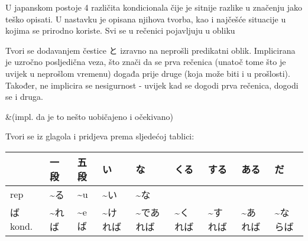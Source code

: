 
\author{Tomislav Mamić}


	
	U japanskom postoje 4 različita kondicionala čije je sitnije razlike u značenju jako teško opisati. U nastavku je opisana njihova tvorba, kao i najčešće situacije u kojima se prirodno koriste. Svi se u rečenici pojavljuju u obliku
	
	

	Tvori se dodavanjem čestice と izravno na neprošli predikatni oblik.	Implicirana je uzročno posljedična veza, što znači da se prva rečenica (unatoč tome što je uvijek u neprošlom vremenu) događa prije druge (koja može biti i u prošlosti). Također, ne implicira se nesigurnost - uvijek kad se dogodi prva rečenica, dogodi se i druga.
	
	\begin{reibun}
		&(impl. da je to nešto uobičajeno i očekivano)\\
	\end{reibun}

	
	Tvori se iz glagola i pridjeva prema sljedećoj tablici:
	
	\vspace{10pt}
	\begin{tabular}{|l|l|l|l|l|l|l|l|l|}
		\hline
		&一段&五段&い&な&くる&する&ある&だ\\\hline
		rep&\textasciitilde る&\textasciitilde u&\textasciitilde い&\textasciitilde な&&&&\\\hline
		ば kond.&\textasciitilde れば&\textasciitilde eば&\textasciitilde ければ&\textasciitilde であれば&\textasciitilde くれば&\textasciitilde すれば&\textasciitilde あれば&\textasciitilde ならば\\\hline
	\end{tabular}
	\vspace{10pt}

